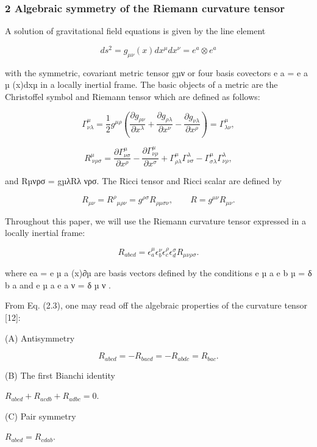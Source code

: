 \documentclass{article}
\begin{document}
\subsubsection{2 Algebraic symmetry of the Riemann curvature tensor}

A solution of gravitational field equations is given by the line element

$$ds^{2}=g_{\mu\nu}(x)dx^{\mu}dx^{\nu}=e^{a}\otimes e^{a}\tag{2.1}$$

with the symmetric, covariant metric tensor gµν or four basis covectors e a = e a µ (x)dxµ in a locally inertial frame. The basic objects of a metric are the Christoffel symbol and Riemann tensor which are defined as follows:

$$\Gamma^{\mu}_{\nu\lambda}=\frac{1}{2}g^{\mu\rho}\left(\frac{\partial g_{\rho\nu}}{\partial x^{\lambda}}+\frac{\partial g_{\rho\lambda}}{\partial x^{\nu}}-\frac{\partial g_{\nu\lambda}}{\partial x^{\rho}}\right)=\Gamma^{\mu}_{\lambda\nu},\tag{2.2}$$

$$R^{\mu}_{\ \nu\rho\sigma}=\frac{\partial\Gamma^{\mu}_{\nu\sigma}}{\partial x^{\rho}}-\frac{\partial\Gamma^{\mu}_{\nu\rho}}{\partial x^{\sigma}}+\Gamma^{\mu}_{\rho\lambda}\Gamma^{\lambda}_{\nu\sigma}-\Gamma^{\mu}_{\sigma\lambda}\Gamma^{\lambda}_{\nu\rho},\tag{2.3}$$

and Rµνρσ = gµλRλ νρσ. The Ricci tensor and Ricci scalar are defined by

$$R_{\mu\nu}=R^{\rho}{}_{\mu\rho\nu}=g^{\rho\sigma}R_{\rho\mu\sigma\nu},\qquad R=g^{\mu\nu}R_{\mu\nu}.\tag{2.4}$$

Throughout this paper, we will use the Riemann curvature tensor expressed in a locally inertial frame:

$$R_{abcd}=\epsilon^{\mu}_{a}\epsilon^{\nu}_{b}\epsilon^{\rho}_{c}\epsilon^{\sigma}_{d}R_{\mu\nu\rho\sigma}.\tag{2.5}$$

where ea = e µ a (x)∂µ are basis vectors defined by the conditions e µ a e b µ = δ b a and e µ a e a ν = δ µ ν .

From Eq. (2.3), one may read off the algebraic properties of the curvature tensor [12]:

(A) Antisymmetry

$$R_{abcd}=-R_{bacd}=-R_{abdc}=R_{bac}.\tag{2.6}$$

(B) The first Bianchi identity

$R_{abcd}+R_{acdb}+R_{adbc}=0$.

(C) Pair symmetry

$R_{abcd}=R_{cdab}$.
\end{document}
